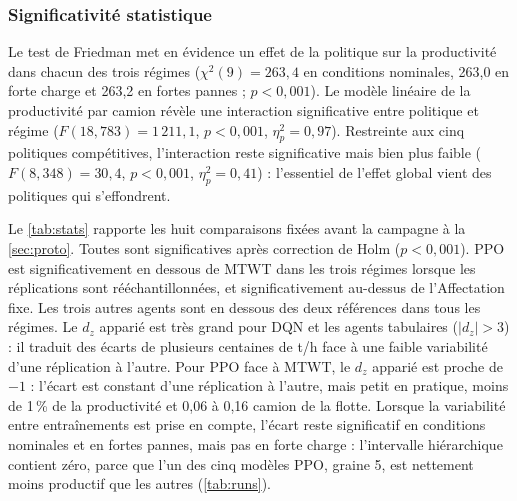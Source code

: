 \documentclass[11pt,a4paper]{article}
\newif\ifrevmarks
\newcommand{\revtag}[1]{\ifrevmarks\textsuperscript{\textcolor{red!70!black}{\scriptsize[#1]}}\fi}
\newenvironment{revbloc}[1]{\par\ifrevmarks\color{revcolor}\noindent\revtag{#1}\ \fi}{\par}
\newif\ifcorrmarks
\newcommand{\corr}[1]{\ifcorrmarks\textcolor{corrcolor}{#1}\else#1\fi}
\begin{document}
\subsubsection{Significativité statistique}
\label{sec:stats}

\begin{revbloc}{T31}
Le test de Friedman met en évidence un effet de la politique sur la productivité dans chacun des trois régimes ($\chi^2(9) = 263{,}4$ en conditions nominales, 263,0 en forte charge et 263,2 en fortes pannes ; $p<0{,}001$). Le modèle linéaire de la productivité par camion révèle une interaction significative entre politique et régime ($F(18, 783) = 1\,211{,}1$, $p<0{,}001$, $\eta^2_p = 0{,}97$). \corr{Restreinte aux cinq politiques compétitives, l'interaction reste significative mais bien plus faible ($F(8, 348) = 30{,}4$, $p<0{,}001$, $\eta^2_p = 0{,}41$) : l'essentiel de l'effet global vient des politiques qui s'effondrent.}

Le \cref{tab:stats} rapporte les huit comparaisons fixées avant la campagne à la \cref{sec:proto}. Toutes sont significatives après correction de Holm ($p<0{,}001$). PPO est significativement en dessous de MTWT dans les trois régimes \corr{lorsque les réplications sont rééchantillonnées}, et significativement au-dessus de l'Affectation fixe. Les trois autres agents sont en dessous des deux références dans tous les régimes. \corr{Le $d_z$ apparié est très grand pour DQN et les agents tabulaires ($|d_z| > 3$)} : il traduit des écarts de plusieurs centaines de t/h face à une faible variabilité d'une réplication à l'autre. \corr{Pour PPO face à MTWT, le $d_z$ apparié est proche de $-1$ : l'écart est constant d'une réplication à l'autre, mais petit en pratique, moins de 1\,\% de la productivité et 0,06 à 0,16 camion de la flotte. Lorsque la variabilité entre entraînements est prise en compte, l'écart reste significatif en conditions nominales et en fortes pannes, mais pas en forte charge : l'intervalle hiérarchique contient zéro, parce que l'un des cinq modèles PPO, graine 5, est nettement moins productif que les autres (\cref{tab:runs}).}


\end{revbloc}
\end{document}
